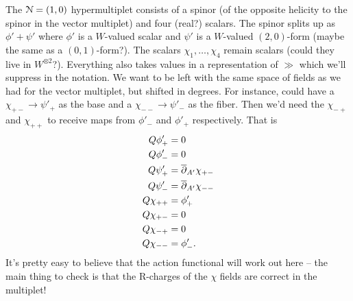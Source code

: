 \documentclass[10pt, oneside]{article}
\begin{document}
The $\mathcal{N}=(1,0)$ hypermultiplet consists of a spinor (of the opposite helicity to the spinor in the vector multiplet) and four (real?) scalars.  The spinor splits up as $\phi' + \psi'$ where $\phi'$ is a $W$-valued scalar and $\psi'$ is a $W$-valued $(2,0)$-form (maybe the same as a $(0,1)$-form?).  The scalars $\chi_1, \ldots, \chi_4$ remain scalars (could they live in $W^{\otimes 2}$?).  Everything also takes values in a representation of $\gg$ which we'll suppress in the notation.  We want to be left with the same space of fields as we had for the vector multiplet, but shifted in degrees.  For instance, could have a $\chi_{+-} \to \psi'_+$ as the base and a $\chi_{--} \to \psi'_-$ as the fiber.  Then we'd need the $\chi_{-+}$ and $\chi_{++}$ to receive maps from $\phi'_-$ and $\phi'_+$ respectively.  That is
\begin{align*}
Q\phi'_+ &= 0 \\
Q\phi'_- &= 0 \\
Q\psi'_+ &= \overline{\partial}_{A'} \chi_{+-}\\
Q\psi'_- &= \overline{\partial}_{A'} \chi_{--}\\
Q\chi_{++} &= \phi'_+\\
Q\chi_{+-} &= 0\\
Q\chi_{-+} &= 0 \\
Q\chi_{--} &= \phi'_-.
\end{align*}
It's pretty easy to believe that the action functional will work out here -- the main thing to check is that the R-charges of the $\chi$ fields are correct in the multiplet!
\end{document}
